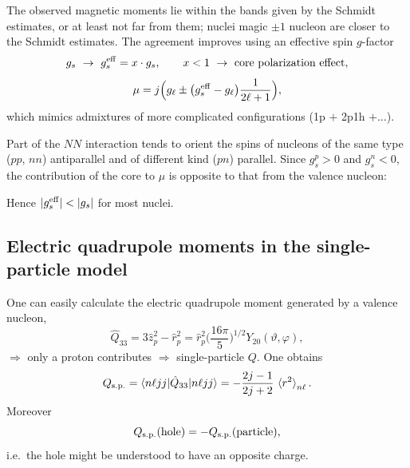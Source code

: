 \documentclass[11pt,a4paper]{article}
\newcommand{\op}[1]{\hat{#1}}
\begin{document}
The observed magnetic moments lie within the bands given by the Schmidt estimates, or at least not far from them; nuclei magic $\pm1$ nucleon are closer to the Schmidt estimates. The agreement improves using an effective spin $g$-factor
\[
g_s\ \to\ g_s^{\rm eff}=x\cdot g_s,\qquad x<1\ \to\ \text{core polarization effect},
\]
\[
\mu=j\Big(g_\ell\pm\big(g_s^{\rm eff}-g_\ell\big)\frac{1}{2\ell+1}\Big),
\]
which mimics admixtures of more complicated configurations (1p $+$ 2p1h $+\dots$).

Part of the $NN$ interaction tends to orient the spins of nucleons of the same type ($pp$, $nn$) antiparallel and of different kind ($pn$) parallel. Since $g_s^p>0$ and $g_s^n<0$, the contribution of the core to $\mu$ is opposite to that from the valence nucleon:
\begin{center}
\end{center}
Hence $|g_s^{\rm eff}|<|g_s|$ for most nuclei.

\subsection{Electric quadrupole moments in the single-particle model}
One can easily calculate the electric quadrupole moment generated by a valence nucleon,
\[
\op Q_{33}=3\op z_p^2-\op r_p^2=\op r_p^2\Big(\frac{16\pi}{5}\Big)^{1/2}Y_{20}(\vartheta,\varphi),
\]
$\Rightarrow$ only a proton contributes $\Rightarrow$ single-particle $Q$. One obtains
\[
Q_{\rm s.p.}=\braket{n\ell jj|\op Q_{33}|n\ell jj}=-\frac{2j-1}{2j+2}\,\braket{r^2}_{n\ell}.
\]
Moreover
\[
Q_{\rm s.p.}(\text{hole})=-Q_{\rm s.p.}(\text{particle}),
\]
i.e.\ the hole might be understood to have an opposite charge.
\end{document}
